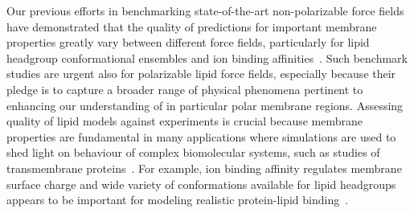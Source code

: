 \documentclass[journal=jacsat,manuscript=article,layout=singlecolumn]{achemso}
\begin{document}

Our previous efforts in benchmarking state-of-the-art non-polarizable force fields have demonstrated that the quality of predictions for important membrane properties greatly vary between different force fields, particularly for lipid headgroup conformational ensembles and ion binding affinities~\cite{Botan2015,Catte2016,Antila2019,bacle21,Antila2021,Antila2022,Databank}. Such benchmark studies are urgent also for polarizable lipid force fields, 
especially because their pledge is
to capture a broader range of physical phenomena pertinent to enhancing our understanding of in particular polar membrane regions.
Assessing quality of lipid models against experiments is crucial because membrane properties are fundamental in many applications where simulations are used to shed light on behaviour of complex biomolecular systems, such as studies of transmembrane proteins~\cite{jing2019polarizable, Lynch21}. For example, ion binding affinity regulates membrane surface charge and wide variety of conformations available for lipid headgroups appears to be important for modeling realistic protein-lipid binding~\cite{bacle21}.
\end{document}
